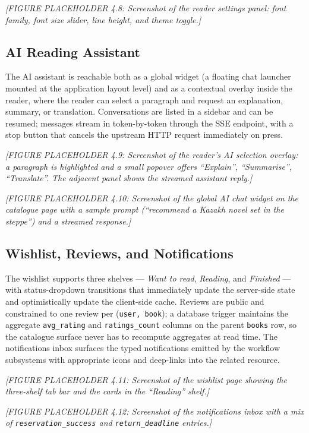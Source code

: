 \documentclass[12pt,a4paper]{report}
\begin{document}
\textit{[FIGURE PLACEHOLDER 4.8: Screenshot of the reader settings
panel: font family, font size slider, line height, and theme toggle.]}

\subsection{AI Reading Assistant}

The AI assistant is reachable both as a global widget (a floating chat
launcher mounted at the application layout level) and as a contextual
overlay inside the reader, where the reader can select a paragraph and
request an explanation, summary, or translation. Conversations are
listed in a sidebar and can be resumed; messages stream in
token-by-token through the SSE endpoint, with a stop button that
cancels the upstream HTTP request immediately on press.

\textit{[FIGURE PLACEHOLDER 4.9: Screenshot of the reader's AI
selection overlay: a paragraph is highlighted and a small popover
offers ``Explain'', ``Summarise'', ``Translate''. The adjacent panel
shows the streamed assistant reply.]}

\textit{[FIGURE PLACEHOLDER 4.10: Screenshot of the global AI chat
widget on the catalogue page with a sample prompt (``recommend a
Kazakh novel set in the steppe'') and a streamed response.]}

\subsection{Wishlist, Reviews, and Notifications}

The wishlist supports three shelves --- \textit{Want to read},
\textit{Reading}, and \textit{Finished} --- with status-dropdown
transitions that immediately update the server-side state and
optimistically update the client-side cache. Reviews are public and
constrained to one review per (\texttt{user, book}); a database
trigger maintains the aggregate \texttt{avg\_rating} and
\texttt{ratings\_count} columns on the parent \texttt{books} row, so
the catalogue surface never has to recompute aggregates at read time.
The notifications inbox surfaces the typed notifications emitted by
the workflow subsystems with appropriate icons and deep-links into
the related resource.

\textit{[FIGURE PLACEHOLDER 4.11: Screenshot of the wishlist page
showing the three-shelf tab bar and the cards in the ``Reading''
shelf.]}

\textit{[FIGURE PLACEHOLDER 4.12: Screenshot of the notifications
inbox with a mix of \texttt{reservation\_success} and
\texttt{return\_deadline} entries.]}
\end{document}
